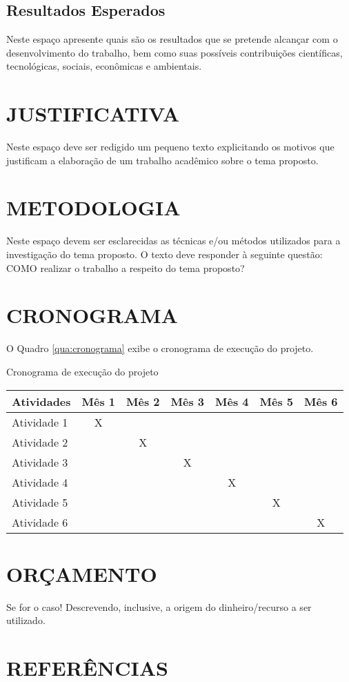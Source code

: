 \documentclass[artigo]{iftex2024}
\begin{document}
\subsection{Resultados Esperados}

Neste espaço apresente quais são os resultados que se pretende alcançar com o desenvolvimento do trabalho, bem como suas possíveis contribuições científicas, tecnológicas, sociais, econômicas e ambientais.

\section{JUSTIFICATIVA}

Neste espaço deve ser redigido um pequeno texto explicitando os motivos que justificam a elaboração de um trabalho acadêmico sobre o tema proposto.

\section{METODOLOGIA}

Neste espaço devem ser esclarecidas as técnicas e/ou métodos utilizados para a investigação do tema proposto. O texto deve responder à seguinte questão: COMO realizar o trabalho a respeito do tema proposto?

\section{CRONOGRAMA}

O Quadro \ref{qua:cronograma} exibe o cronograma de execução do projeto.

\begin{board}[!htb]
\caption{Cronograma de execução do projeto} \label{qua:cronograma}
\begin{tabularx}{\textwidth}{|X|c|c|c|c|c|c|} \hline
\bfseries Atividades & \bfseries Mês 1 & \bfseries Mês 2 & \bfseries Mês 3 & \bfseries Mês 4 & \bfseries Mês 5 & \bfseries Mês 6 \\ \hline
Atividade 1            &    X    &         &         &         &         &         \\ \hline
Atividade 2            &         &    X    &         &         &         &         \\ \hline
Atividade 3            &         &         &    X    &         &         &         \\ \hline
Atividade 4            &         &         &         &    X    &         &         \\ \hline
Atividade 5            &         &         &         &         &    X    &         \\ \hline
Atividade 6            &         &         &         &         &         &    X    \\ \hline
\end{tabularx}
\end{board}

\section{ORÇAMENTO}

Se for o caso! Descrevendo, inclusive, a origem do dinheiro/recurso a ser utilizado.

\section*{REFERÊNCIAS}

\printbibliography
\end{document}
